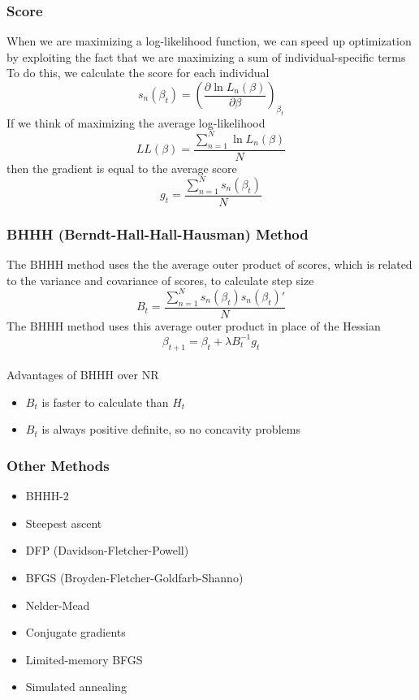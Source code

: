 \documentclass{beamer}\usepackage[]{graphicx}\usepackage[]{color}
\begin{document}
\begin{frame}\frametitle{Score}
    When we are maximizing a log-likelihood function, we can speed up optimization by exploiting the fact that we are maximizing a sum of individual-specific terms \\
    \vspace{2ex}
    To do this, we calculate the score for each individual
    $$s_n(\beta_t) = \left( \frac{\partial \ln L_n(\beta)}{\partial \beta} \right)_{\beta_t}$$
    If we think of maximizing the average log-likelihood
    $$LL(\beta) = \frac{\sum_{n = 1}^N \ln L_n(\beta)}{N}$$
    then the gradient is equal to the average score
    $$g_t = \frac{\sum_{n = 1}^N s_n(\beta_t)}{N}$$
\end{frame}

\begin{frame}\frametitle{BHHH (Berndt-Hall-Hall-Hausman) Method}
    The BHHH method uses the the average outer product of scores, which is related to the variance and covariance of scores, to calculate step size
    $$B_t = \frac{\sum_{n = 1}^N s_n(\beta_t) s_n(\beta_t)'}{N}$$
    The BHHH method uses this average outer product in place of the Hessian
    $$\beta_{t + 1} = \beta_t + \lambda B_t^{-1} g_t$$ \\
    \vspace{2ex}
    Advantages of BHHH over NR
    \begin{itemize}
        \item $B_t$ is faster to calculate than $H_t$
        \item $B_t$ is always positive definite, so no concavity problems
    \end{itemize}
\end{frame}

\begin{frame}\frametitle{Other Methods}
    \begin{itemize}
        \item BHHH-2
        \item Steepest ascent
        \item DFP (Davidson-Fletcher-Powell)
        \item BFGS (Broyden-Fletcher-Goldfarb-Shanno)
        \item Nelder-Mead
        \item Conjugate gradients
        \item Limited-memory BFGS
        \item Simulated annealing
    \end{itemize}
\end{frame}
\end{document}
